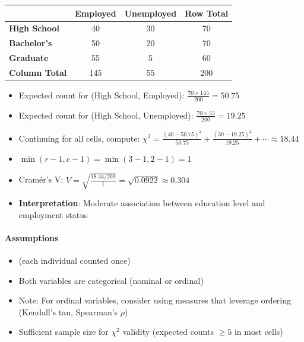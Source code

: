 \begin{center}
\begin{tabular}{|l|c|c|c|}
    \hline
    & \textbf{Employed} & \textbf{Unemployed} & \textbf{Row Total} \\
    \hline
    \textbf{High School} & 40 & 30 & 70 \\
    \textbf{Bachelor's} & 50 & 20 & 70 \\
    \textbf{Graduate} & 55 & 5 & 60 \\
    \hline
    \textbf{Column Total} & 145 & 55 & 200 \\
    \hline
\end{tabular}
\end{center}

\begin{itemize}
    \item Expected count for (High School, Employed): $\frac{70 \times 145}{200} = 50.75$
    \item Expected count for (High School, Unemployed): $\frac{70 \times 55}{200} = 19.25$
    \item Continuing for all cells, compute: $\chi^2 = \frac{(40-50.75)^2}{50.75} + \frac{(30-19.25)^2}{19.25} + \cdots \approx 18.44$
    \item $\min(r-1, c-1) = \min(3-1, 2-1) = 1$
    \item Cramér's V: $V = \sqrt{\frac{18.44/200}{1}} = \sqrt{0.0922} \approx 0.304$
    \item \textbf{Interpretation}: Moderate association between education level and employment status
\end{itemize}

\paragraph{Assumptions}
\begin{itemize}
    \item {} (each individual counted once)
    \item Both variables are categorical (nominal or ordinal)
    \item Note: For ordinal variables, consider using measures that leverage ordering
        (Kendall's tau, Spearman's $\rho$)
    \item Sufficient sample size for $\chi^2$ validity (expected counts $\geq 5$ in most cells)
\end{itemize}

